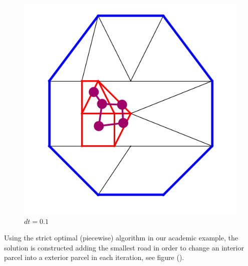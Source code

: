 \documentclass[10pt]{article}
\begin{document}
\begin{figure}[H]
\begin{minipage}{.33\linewidth}
        \caption{$dt=0.1$}
        \label{fig:prob1_6_2}
    \end{minipage}%
    \begin{minipage}{.33\linewidth}
        \centering
        \includegraphics[width=1\textwidth]{images/dual4.png}
        \caption{$dt=0.1$}
        \label{fig:prob1_6_2}
    \end{minipage}
\end{figure}
 
Using the strict optimal (piecewise) algorithm in our academic example, the solution is constructed adding the smallest road in order to change an interior parcel into a exterior parcel in each iteration, see figure ().
\end{document}

